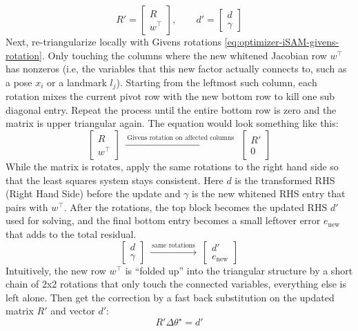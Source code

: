 $$
    R' = \begin{bmatrix} R\\ w^\top \end{bmatrix},\qquad
    d' = \begin{bmatrix} d\\ \gamma \end{bmatrix}
$$
Next, re-triangularize locally with Givens rotations \eqref{eq:optimizer-iSAM-givens-rotation}. Only touching the columns where the new whitened Jacobian row $w^\top$ has nonzeros (i.e, the variables that this new factor actually connects to, such as a pose $x_i$ or a landmark $l_j$). Starting from the leftmost such column, each rotation mixes the current pivot row with the new bottom row to kill one sub diagonal entry. Repeat the process until the entire bottom row is zero and the matrix is upper triangular again. The equation would look something like this:
$$
    \begin{bmatrix} R\\ w^\top \end{bmatrix}
    \ \xrightarrow{\ \text{Givens rotation on affected columns}\ }\ 
    \begin{bmatrix} R'\\ 0 \end{bmatrix}
$$
While the matrix is rotates, apply the same rotations to the right hand side so that the least squares system stays consistent. Here $d$ is the transformed RHS (Right Hand Side) before the update and $\gamma$ is the new whitened RHS entry that pairs with $w^\top$. After the rotations, the top block becomes the updated RHS $d'$ used for solving, and the final bottom entry becomes a small leftover error $e_{\text{new}}$ that adds to the total residual. 
$$
    \begin{bmatrix} d\\ \gamma \end{bmatrix}
    \ \xrightarrow{\ \text{same rotations}\ }\ 
    \begin{bmatrix} d'\\ e_{\text{new}} \end{bmatrix}
$$
Intuitively, the new row $w^\top$ is ``folded up'' into the triangular structure by a short chain of 2x2 rotations that only touch the connected variables, everything else is left alone. Then get the correction by a fast back substitution on the updated matrix $R'$ and vector $d'$:
$$
    R'\Delta\theta^\star = d'
$$



